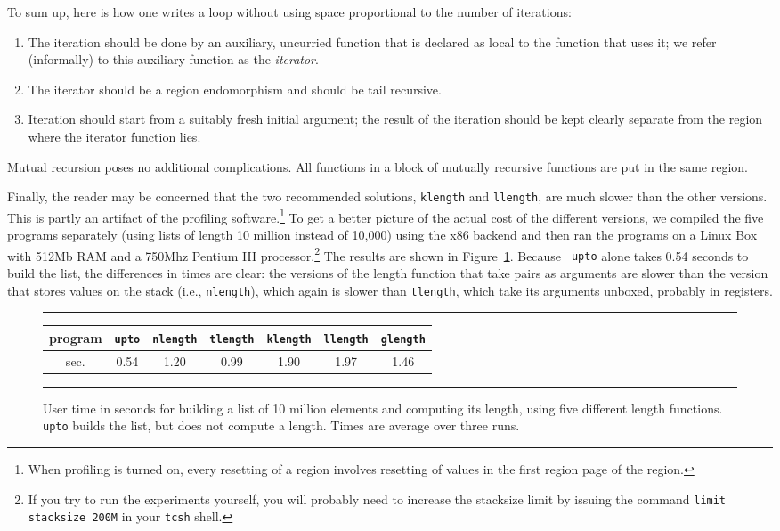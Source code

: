 \documentclass[12pt]{book}
\begin{document}
To sum up, here is how one writes a loop without using space
proportional to the number of iterations:
%
\begin{enumerate}
\item The iteration should be done by an auxiliary, uncurried function
  that is declared as local to the function that uses it; we refer
  (informally) to this auxiliary function as the
  {\em iterator}.
\item The iterator should be a
  region endomorphism and should be tail recursive.
\item Iteration should start from a suitably fresh initial argument;
  the result of the iteration should be kept clearly separate from the
  region where the iterator function lies.
\end{enumerate}
Mutual recursion poses no additional complications. All functions in a
block of mutually recursive functions are put in the same region.

Finally, the reader may be concerned that the two recommended
solutions, {\tt klength} and {\tt llength}, are much slower than the
other versions. This is partly an artifact of the profiling
software.\footnote{When profiling is turned on, every resetting of a
  region involves resetting of values in the first region page of the
  region.} To get a better picture of the actual cost of the different
versions, we compiled the five programs separately (using lists of
length 10 million instead of 10,000) using the x86 backend and then
ran the programs on a Linux Box with 512Mb RAM and a 750Mhz Pentium
III processor.\footnote{If you try to run the experiments yourself,
  you will probably need to increase the stacksize limit by issuing
  the command {\tt limit stacksize 200M} in your {\tt tcsh} shell.}
The results are shown in Figure~\ref{length.timing.fig}. Because {\tt
  upto} alone takes 0.54 seconds to build the list, the differences in
times are clear: the versions of the length function that take pairs
as arguments are slower than the version that stores values on the
stack (i.e., {\tt nlength}), which again is slower than {\tt tlength},
which take its arguments unboxed, probably in registers.

\begin{figure}
\hrule
\medskip
\begin{center}
\begin{tabular}{|c|c|c|c|c|c|c|}\hline
program      & {\tt upto} & {\tt nlength} & {\tt tlength} & {\tt klength} & {\tt llength} & {\tt glength} \\ \hline
sec. & 0.54 & 1.20 & 0.99 & 1.90 & 1.97 & 1.46 \\ \hline
\end{tabular}
\end{center}
\caption{User time in seconds for building a list of 10 million elements and
computing its length, using five different length functions. {\tt upto} builds
the list, but does not compute a length. Times are average
over three runs.}
\label{length.timing.fig}
\medskip
\hrule
\end{figure}
\end{document}
